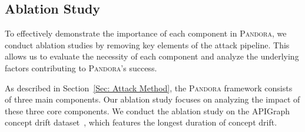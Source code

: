 \documentclass[lettersize,journal]{IEEEtran}
\newcommand{\pandora}{{\scshape Pandora}\xspace}
\begin{document}
\subsection{Ablation Study}
To effectively demonstrate the importance of each component in \pandora, we conduct ablation studies by removing key elements of the attack pipeline.
This allows us to evaluate the necessity of each component and analyze the underlying factors contributing to \pandora’s success.
\begin{table}[h!]
	\caption{Attack value assessment necessity analysis}
	\label{tab: Attack Value Assessment necessity analysis}
	\setlength{\tabcolsep}{5.8pt}
	\begin{center}
	\end{center}
\end{table}
As described in Section~\ref{Sec: Attack Method}, the \pandora framework consists of three main components.
Our ablation study focuses on analyzing the impact of these three core components.
We conduct the ablation study on the APIGraph concept drift dataset~\cite{2020-CCS-APIGraph}, which features the longest duration of concept drift.
\end{document}
